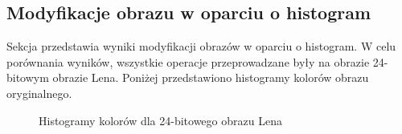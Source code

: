 \documentclass{classrep}
\begin{document}
\subsection{Modyfikacje obrazu w oparciu o histogram}
Sekcja przedstawia wyniki modyfikacji obrazów w oparciu o histogram. W celu porównania wyników, wszystkie operacje przeprowadzane były na obrazie 24-bitowym obrazie Lena. Poniżej przedstawiono histogramy kolorów obrazu oryginalnego.
\begin{figure}[H]%
    \centering
    \qquad
    \qquad
    \qquad
    \caption{Histogramy kolorów dla 24-bitowego obrazu Lena}%
\end{figure}
\end{document}
